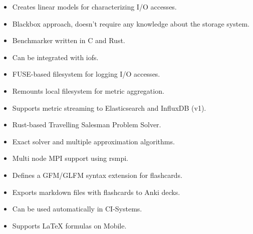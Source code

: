 \documentclass[10pt,a4paper,ragged2e,withhyper]{altacv}
\begin{document}
\begin{paracol}{2}

\begin{itemize}
\item Creates linear models for characterizing I/O accesses.
\item Blackbox approach, doesn't require any knowledge about the storage system.
\item Benchmarker written in C and Rust.
\item Can be integrated with iofs.
\end{itemize}

\divider

\begin{itemize}
\item FUSE-based filesystem for logging I/O accesses.
\item Remounts local filesystem for metric aggregation.
\item Supports metric streaming to Elasticsearch and InfluxDB (v1).
\end{itemize}

\divider

\begin{itemize}
\item Rust-based Travelling Salesman Problem Solver.
\item Exact solver and multiple approximation algorithms.
\item Multi node MPI support using rsmpi.
\end{itemize}

\divider

\begin{itemize}
\item Defines a GFM/GLFM syntax extension for flashcards.
\item Exports markdown files with flashcards to Anki decks.
\item Can be used automatically in CI-Systems.
\item Supports \LaTeX{} formulas on Mobile.
\end{itemize}


\end{paracol}
\end{document}
